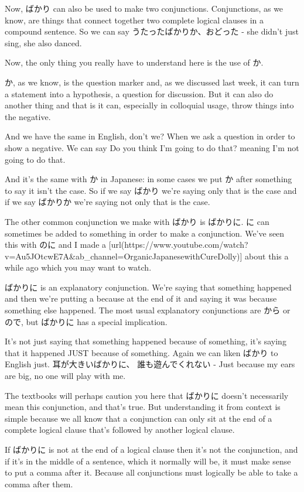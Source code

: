 Now, ばかり can also be used to make two conjunctions. Conjunctions, as we know, are things that connect together two complete logical clauses in a compound sentence. So we can say うたったばかりか、おどった - she didn't just sing, she also danced.

Now, the only thing you really have to understand here is the use of か.

{}

か, as we know, is the question marker and, as we discussed last week, it can turn a statement into a hypothesis, a question for discussion. But it can also do another thing and that is it can, especially in colloquial usage, throw things into the negative.

And we have the same in English, don't we? When we ask a question in order to show a negative. We can say Do you think I'm going to do that? meaning I'm not going to do that.

And it's the same with か in Japanese: in some cases we put か after something to say it isn't the case. So if we say ばかり we're saying only that is the case and if we say ばかりか we're saying not only that is the case.

The other common conjunction we make with ばかり is ばかりに. に can sometimes be added to something in order to make a conjunction. We've seen this with のに and I made a [url(https://www.youtube.com/watch?v=Au5JOtcwE7A&ab_channel=OrganicJapanesewithCureDolly)] about this a while ago which you may want to watch.

ばかりに is an explanatory conjunction. We're saying that something happened and then we're putting a because at the end of it and saying it was because something else happened. The most usual explanatory conjunctions are から or ので, but ばかりに has a special implication.

It's not just saying that something happened because of something, it's saying that it happened JUST because of something. Again we can liken ばかり to English just. 耳が大きいばかりに、 誰も遊んでくれない - Just because my ears are big, no one will play with me.

{}

The textbooks will perhaps caution you here that ばかりに doesn't necessarily mean this conjunction, and that's true. But understanding it from context is simple because we all know that a conjunction can only sit at the end of a complete logical clause that's followed by another logical clause.

If ばかりに is not at the end of a logical clause then it's not the conjunction, and if it's in the middle of a sentence, which it normally will be, it must make sense to put a comma after it. Because all conjunctions must logically be able to take a comma after them.

\stopsectionlevel
